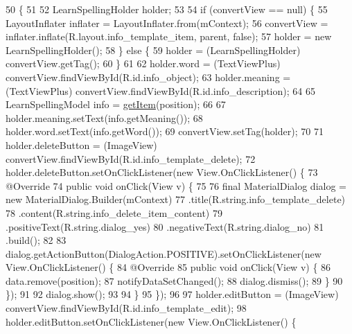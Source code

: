 \begin{DoxyCode}
50                                                                                 \{
51 
52         LearnSpellingHolder holder;
53 
54         \textcolor{keywordflow}{if} (convertView == null) \{
55             LayoutInflater inflater = LayoutInflater.from(mContext);
56             convertView = inflater.inflate(R.layout.info\_template\_item, parent, \textcolor{keyword}{false});
57             holder = \textcolor{keyword}{new} LearnSpellingHolder();
58         \} \textcolor{keywordflow}{else} \{
59             holder = (LearnSpellingHolder) convertView.getTag();
60         \}
61 
62         holder.word = (TextViewPlus) convertView.findViewById(R.id.info\_object);
63         holder.meaning = (TextViewPlus) convertView.findViewById(R.id.info\_description);
64 
65         LearnSpellingModel info = \hyperlink{classorg_1_1buildmlearn_1_1toolkit_1_1templates_1_1LearnSpellingAdapter_af0b0934c215c709326ded3e7fc3b56aa}{getItem}(position);
66 
67         holder.meaning.setText(info.getMeaning());
68         holder.word.setText(info.getWord());
69         convertView.setTag(holder);
70 
71         holder.deleteButton = (ImageView) convertView.findViewById(R.id.info\_template\_delete);
72         holder.deleteButton.setOnClickListener(\textcolor{keyword}{new} View.OnClickListener() \{
73             @Override
74             \textcolor{keyword}{public} \textcolor{keywordtype}{void} onClick(View v) \{
75 
76                 \textcolor{keyword}{final} MaterialDialog dialog = \textcolor{keyword}{new} MaterialDialog.Builder(mContext)
77                         .title(R.string.info\_template\_delete)
78                         .content(R.string.info\_delete\_item\_content)
79                         .positiveText(R.string.dialog\_yes)
80                         .negativeText(R.string.dialog\_no)
81                         .build();
82 
83                 dialog.getActionButton(DialogAction.POSITIVE).setOnClickListener(\textcolor{keyword}{new} View.OnClickListener()
       \{
84                     @Override
85                     \textcolor{keyword}{public} \textcolor{keywordtype}{void} onClick(View v) \{
86                         data.remove(position);
87                         notifyDataSetChanged();
88                         dialog.dismiss();
89                     \}
90                 \});
91 
92                 dialog.show();
93 
94             \}
95         \});
96 
97         holder.editButton = (ImageView) convertView.findViewById(R.id.info\_template\_edit);
98         holder.editButton.setOnClickListener(\textcolor{keyword}{new} View.OnClickListener() \{

\end{DoxyCode}
